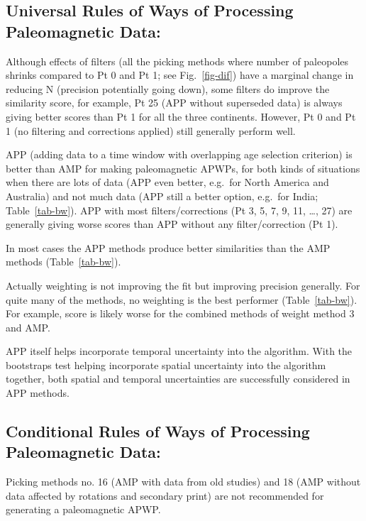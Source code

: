 \subsection{Universal Rules of Ways of Processing Paleomagnetic Data:}
%
\begin{description}
  \item Although effects of filters (all the picking methods where number of
	paleopoles shrinks compared to Pt 0 and Pt 1; see Fig.~\ref{fig-dif}) have a
	marginal change in reducing N (precision potentially going down), some
	filters do improve the similarity score, for example, Pt 25 (APP without
	superseded data) is always giving better scores than Pt 1 for all the
	three continents. However, Pt 0 and Pt 1 (no filtering and corrections
	applied) still generally perform well.
  \item APP (adding data to a time window with overlapping age selection
	criterion) is better than AMP for making paleomagnetic APWPs, for both kinds
	of situations when there are lots of data (APP even better, e.g.\ for North
	America and Australia) and not much data (APP still a better option, e.g.\
	for India; Table~\ref{tab-bw}). APP with most filters/corrections (Pt 3, 5,
	7, 9, 11, \ldots, 27) are generally giving worse scores than APP without any
	filter/correction (Pt 1).
  \item In most cases the APP methods produce better similarities than the AMP
	methods (Table~\ref{tab-bw}).
  \item Actually weighting is not improving the fit but improving precision
	generally. For quite many of the methods, no weighting is the best performer
	(Table~\ref{tab-bw}). For example, score is likely worse for the combined
	methods of weight method 3 and AMP.
  \item APP itself helps incorporate temporal uncertainty into the algorithm.
	With the bootstraps test helping incorporate spatial uncertainty into the
	algorithm together, both spatial and temporal uncertainties are successfully
	considered in APP methods.
\end{description}

\subsection{Conditional Rules of Ways of Processing Paleomagnetic Data:}
%
\begin{description}
  \item Picking methods no. 16 (AMP with data from old studies) and 18 (AMP
	without data affected by rotations and secondary print) are not recommended
	for generating a paleomagnetic APWP.
\end{description}

